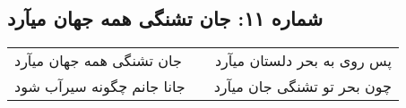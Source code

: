 \begin{center}
\section*{شماره ۱۱: جان تشنگی همه جهان میآرد}
\label{sec:011}
\begin{longtable}{l p{0.5cm} r}
جان تشنگی همه جهان میآرد
&&
پس روی به بحر دلستان میآرد
\\
جانا جانم چگونه سیرآب شود
&&
چون بحر تو تشنگی جان میآرد
\\
\end{longtable}
\end{center}
